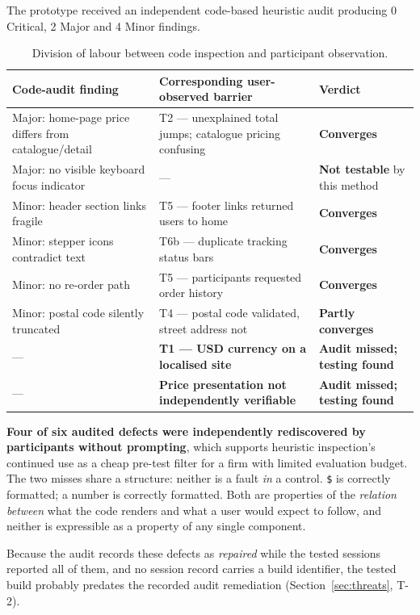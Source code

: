 \documentclass[]{interact}
\theoremstyle{plain}
\begin{document}
The prototype received an independent code-based heuristic audit producing 0 Critical, 2 Major and 4
Minor findings.

\begin{table}[htbp]
\caption{Division of labour between code inspection and participant observation.}
\label{tab:division}
\begin{tabular}{@{}p{} p{} p{}@{}}
\toprule
\textbf{Code-audit finding} & \textbf{Corresponding user-observed barrier} & \textbf{Verdict} \\
\midrule
Major: home-page price differs from catalogue/detail & T2 --- unexplained total jumps; catalogue pricing confusing & \textbf{Converges} \\
Major: no visible keyboard focus indicator & --- & \textbf{Not testable} by this method \\
Minor: header section links fragile & T5 --- footer links returned users to home & \textbf{Converges} \\
Minor: stepper icons contradict text & T6b --- duplicate tracking status bars & \textbf{Converges} \\
Minor: no re-order path & T5 --- participants requested order history & \textbf{Converges} \\
Minor: postal code silently truncated & T4 --- postal code validated, street address not & \textbf{Partly converges} \\
--- & \textbf{T1 --- USD currency on a localised site} & \textbf{Audit missed; testing found} \\
--- & \textbf{Price presentation not independently verifiable} & \textbf{Audit missed; testing found} \citep{braniwati2026price} \\
\bottomrule
\end{tabular}
\end{table}

\textbf{Four of six audited defects were independently rediscovered by participants without
prompting}, which supports heuristic inspection's continued use as a cheap pre-test filter for a firm
with limited evaluation budget. The two misses share a structure: neither is a fault \emph{in} a
control. \texttt{\$} is correctly formatted; a number is correctly formatted. Both are properties of
the \emph{relation between} what the code renders and what a user would expect to follow, and neither
is expressible as a property of any single component.

Because the audit records these defects as \emph{repaired} while the tested sessions reported all of
them, and no session record carries a build identifier, the tested build probably predates the recorded
audit remediation (Section~\ref{sec:threats}, T-2).
\end{document}
